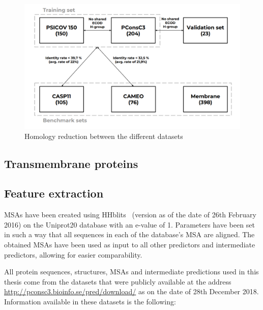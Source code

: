     \begin{figure}[H]
      \begin{center}
        \includegraphics[width=\textwidth, keepaspectratio]{imgs/datasets.png}
         \caption{Homology reduction between the different datasets}
        \label{homology_reduction}
      \end{center}
    \end{figure}

  \subsection{Transmembrane proteins}

    \todo{}

  \subsection{Feature extraction}

    MSAs have been created using HHblits~\cite{HHblits} (version as of the date of 26th February 2016) on the Uniprot20 database
    with an e-value of 1. Parameters have been set in such a way that all sequences in each of the database's MSA are aligned.
    The obtained MSAs have been used as input to all other predictors and intermediate predictors, allowing for easier comparability.

    All protein sequences, structures, MSAs and intermediate predictions used in this thesis come from the datasets that were publicly
    available at the address \url{http://pconsc3.bioinfo.se/pred/download/} as on the date of 28th December 2018.
    Information available in these datasets is the following:


